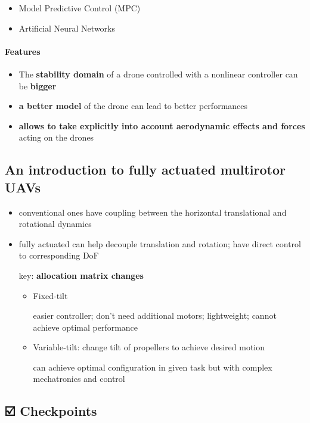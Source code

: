 \documentclass[]{article}
\let\oldparagraph\paragraph
\renewcommand{\paragraph}[1]{\oldparagraph{#1}\mbox{}}
\begin{document}
\begin{itemize}
\item
  Model Predictive Control (MPC)
\item
  Artificial Neural Networks
\end{itemize}

\paragraph{Features}\label{header-n766}

\begin{itemize}
\item
  The \textbf{stability domain} of a drone controlled with a nonlinear
  controller can be \textbf{bigger}
\item
  \textbf{a better model} of the drone can lead to better performances
\item
  \textbf{allows to take explicitly into account aerodynamic effects and
  forces} acting on the drones
\end{itemize}

\subsection{An introduction to fully actuated multirotor
UAVs}\label{header-n774}

\begin{itemize}
\item
  conventional ones have coupling between the horizontal translational
  and rotational dynamics
\item
  fully actuated can help decouple translation and rotation; have direct
  control to corresponding DoF

  key: \textbf{allocation matrix changes}

  \begin{itemize}
  \item
    Fixed-tilt

    easier controller; don't need additional motors; lightweight; cannot
    achieve optimal performance
  \item
    Variable-tilt: change tilt of propellers to achieve desired motion

    can achieve optimal configuration in given task but with complex
    mechatronics and control
  \end{itemize}
\end{itemize}

\subsection{☑️ Checkpoints}\label{header-n788}
\end{document}
